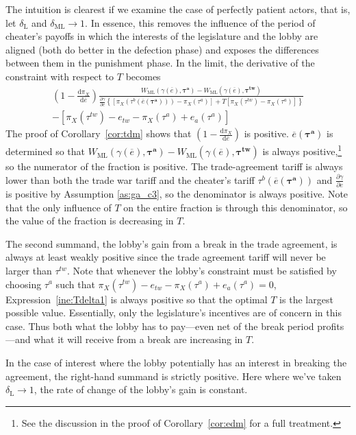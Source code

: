 \documentclass[authoryear, review]{elsarticle}
\newcommand{\ov}{\overline}
\newcommand{\bta}{\bm{\tau^a}}
\newcommand{\ga}{\gamma}
\newcommand{\btw}{\bm{\tau^{tw}}}
\newcommand{\de}{\delta}
\begin{document}
The intuition is clearest if we examine the case of perfectly patient actors, that is, let $\de_\text{L}$ and $\de_\text{ML} \rightarrow 1$. In essence, this removes the influence of the period of cheater's payoffs in which the interests of the legislature and the lobby are aligned (both do better in the defection phase) and exposes the differences between them in the punishment phase. In the limit, the derivative of the constraint with respect to $T$ becomes
\begin{multline}
  \left(1 - \frac{\mathrm{d} \pi_X}{\mathrm{d} \ov{e}} \right) \frac{ W_\text{ML}(\ga(\ov{e}),\bta) - W_\text{ML}(\ga(\ov{e}),\btw) }{\frac{\partial \ga}{\partial e} \left\{
  \left[ \pi_X(\tau^b(\ov{e}(\bta))) - \pi_X(\tau^a) \right] + T \left[ \pi_X(\tau^{tw}) - \pi_X(\tau^a) \right]\right\}} \\ - \left[ \pi_X(\tau^{tw}) - e_{tw} -\pi_X(\tau^a) + e_a(\tau^a) \right]
 	\label{ine:Tdelta1}
\end{multline}
The proof of Corollary~\ref{cor:tdm} shows that $\left(1 - \frac{\mathrm{d} \pi_X}{\mathrm{d} \ov{e}} \right)$ is positive. $\ov{e}(\bta)$ is determined so that $W_\text{ML}(\ga(\ov{e}),\bta) - W_\text{ML}(\ga(\ov{e}),\btw)$ is always positive,\footnote{See the discussion in the proof of Corollary~\ref{cor:edm} for a full treatment.} so the numerator of the fraction is positive. The trade-agreement tariff is always lower than both the trade war tariff and the cheater's tariff $\tau^b\left(\ov{e}(\bta)\right)$ and $\frac{\partial \ga}{\partial e}$ is positive by Assumption \ref{as:ga_c3}, so the denominator is always positive. Note that the only influence of $T$ on the entire fraction is through this denominator, so the value of the fraction is decreasing in $T$.

The second summand, the lobby's gain from a break in the trade agreement, is always at least weakly positive since the trade agreement tariff will never be larger than $\tau^{tw}$. Note that whenever the lobby's constraint must be satisfied by choosing $\tau^a$ such that $\pi_X(\tau^{tw}) - e_{tw} -\pi_X(\tau^a) + e_a(\tau^a) =0$, Expression~\ref{ine:Tdelta1} is always positive so that the optimal $T$ is the largest possible value. Essentially, only the legislature's incentives are of concern in this case. Thus both what the lobby has to pay---even net of the break period profits---and what it will receive from a break are increasing in $T$.

In the case of interest where the lobby potentially has an interest in breaking the agreement, the right-hand summand is strictly positive. Here where we've taken $\de_\text{L} \rightarrow 1$, the rate of change of the lobby's gain is constant.
\end{document}
